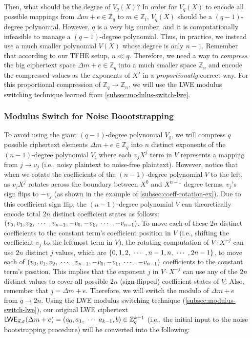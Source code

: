 Then, what should be the degree of $V_q(X)$? In order for $V_q(X)$ to encode all possible mappings from $\Delta m + e \in \mathbb{Z}_q$ to $m \in \mathbb{Z}_t$, $V_q(X)$ should be a $(q-1)$-degree polynomial. However, $q$ is a very big number, and it is computationally infeasible to manage a $(q-1)$-degree polynomial. Thus, in practice, we instead use a much smaller polynomial $V(X)$ whose degree is only $n-1$. Remember that according to our TFHE setup, $n \ll q$. Therefore, we need a way to \textit{compress} the big ciphertext space $\Delta m + e \in \mathbb{Z}_q$ into a much smaller space $\mathbb{Z}_n$ and encode the compressed values as the exponents of $X^j$ in a \textit{proportionally} correct way. For this proportional compression of $\mathbb{Z}_q \rightarrow \mathbb{Z}_n$, we will use the LWE modulus switching technique learned from \autoref{subsec:modulus-switch-lwe}. 

\subsubsection{Modulus Switch for Noise Boootstrapping}
\label{subsec:bootstrapping-modulus-switch}

To avoid using the giant $(q-1)$-degree polynomial $V_q$, we will compress $q$ possible ciphertext elements $\Delta m + e \in \mathbb{Z}_q$ into $n$ distinct exponents of the $(n-1)$-degree polynomial $V$, where each $v_jX^j$ term in $V$ represents a mapping from $j \rightarrow v_j$ (i.e., noisy plaintext to noise-free plaintext). However, notice that when we rotate the coefficients of the $(n-1)$-degree polynomial $V$ to the left, as $v_jX^j$ rotates across the boundary between $X^0$ and $X^{n-1}$ degree terms, $v_j$'s sign flips to $-v_j$ (as shown in the example of \autoref{subsec:coeff-rotation-ex}). Due to this coefficient sign flip, the $(n-1)$-degree polynomial $V$ can theoretically encode total $2n$ distinct coefficient states as follows: $(v_0, v_1, v_2, \text{ } \text{$\cdots$} \text{ }, v_{n-1}, -v_0, -v_1, \text{ } \text{$\cdots$} \text{ }, -v_{n-1})$. To move each of these $2n$ distinct coefficients to the constant term's coefficient position in $V$ (i.e., shifting the coefficient $v_j$ to the leftmost term in $V$), the rotating computation of $V \cdot X^{-j}$ can use $2n$ distinct $j$ values, which are $\{0, 1, 2, \text{ } \text{$\cdots$} \text{ }, n-1, n, \text{ } \text{$\cdots$} \text{ }, 2n-1\}$, to move each of $(v_0, v_1, v_2, \text{ } \text{$\cdots$} \text{ }, v_{n-1}, -v_0, -v_1, \text{ } \text{$\cdots$} \text{ }, -v_{n-1})$ coefficients to the constant term's position. This implies that the exponent $j$ in $V\cdot X^{-j}$ can use any of the $2n$ distinct values to cover all possible $2n$ (sign-flipped) coefficient states of $V$. Also, remember that $j = \Delta m + e$.  Therefore, we will switch the modulo of $\Delta m + e$ from $q \rightarrow 2n$. Using the LWE modulus switching technique (\autoref{subsec:modulus-switch-lwe}), our original LWE ciphertext $\textsf{LWE}_{\vec{s}, \sigma}(\Delta m + e) = ({a}_0, {a}_1, \text{ } \text{$\cdots$} \text{ } {a}_{k-1}, {b}) \in \mathbb{Z}_q^{k+1}$ (i.e., the initial input to the noise bootstrapping procedure) will be converted into the following: 

